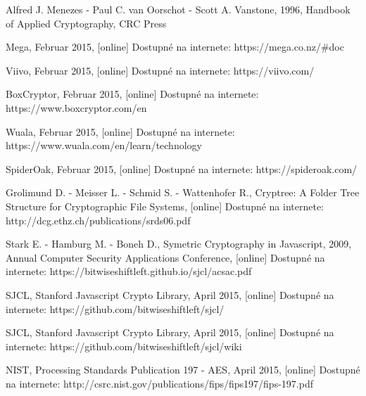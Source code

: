 \documentclass[12pt, oneside]{book}
\theoremstyle{definition} \newtheorem{defi}{Definícia}
\begin{document}
\newpage	

\backmatter

\thispagestyle{empty}
\nocite{*}
\clearpage


 

\begin{thebibliography}{1}

 Alfred J. Menezes - Paul C. van Oorschot - Scott A. Vanstone, 1996, Handbook of Applied Cryptography, CRC Press

 Mega, Februar 2015,  [online] Dostupné na internete: https://mega.co.nz/\#doc

 Viivo, Februar 2015,  [online] Dostupné na internete: https://viivo.com/

 BoxCryptor, Februar 2015,  [online] Dostupné na internete: https://www.boxcryptor.com/en

 Wuala, Februar 2015, [online] Dostupné na internete: https://www.wuala.com/en/learn/technology

 SpiderOak, Februar 2015,  [online] Dostupné na internete: https://spideroak.com/

 Grolimund D. - Meisser L. - Schmid S. - Wattenhofer R., Cryptree: A Folder Tree Structure for Cryptographic File Systems, [online] Dostupné na internete: http://dcg.ethz.ch/publications/srds06.pdf
 
 Stark E. - Hamburg M. - Boneh D., Symetric Cryptography in Javascript, 2009, Annual Computer Security Applications Conference,  [online]  Dostupné na internete: https://bitwiseshiftleft.github.io/sjcl/acsac.pdf

 SJCL, Stanford Javascript Crypto Library, April 2015,  [online]  Dostupné na internete: https://github.com/bitwiseshiftleft/sjcl/

 SJCL, Stanford Javascript Crypto Library, April 2015,  [online]  Dostupné na internete: https://github.com/bitwiseshiftleft/sjcl/wiki

 NIST, Processing Standards Publication 197 - AES, April 2015,  [online]  Dostupné na internete: http://csrc.nist.gov/publications/fips/fips197/fips-197.pdf



\end{thebibliography}
\end{document}

